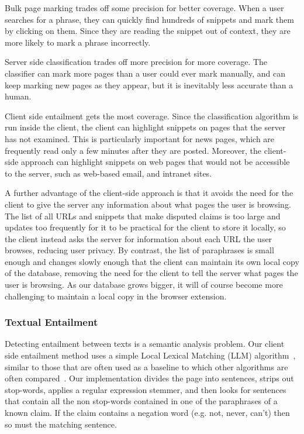\documentclass{www2010-submission}
\begin{document}
Bulk page marking trades off some precision for better coverage. When a user searches for a phrase, they can quickly find hundreds of snippets and mark them by clicking on them. Since they are reading the snippet out of context, they are more likely to mark a phrase incorrectly. 

Server side classification trades off more precision for more coverage. The classifier can mark more pages than a user could ever mark manually, and can keep marking new pages as they appear, but it is inevitably less accurate than a human.

Client side entailment gets the most coverage. Since the classification algorithm is run inside the client, the client can highlight snippets on pages that the server has not examined. This is particularly important for news pages, which are frequently read only a few minutes after they are posted. Moreover, the client-side approach can highlight snippets on web pages that would not be accessible to the server, such as web-based email, and intranet sites. 

A further advantage of the client-side approach is that it avoids the need for the client to give the server any information about what pages the user is browsing. The list of all URLs and snippets that make disputed claims is too large and updates too frequently for it to be practical for the client to store it locally, so the client instead asks the server for information about each URL the user browses, reducing user privacy. By contrast, the list of paraphrases is small enough and changes slowly enough that the client can maintain its own local copy of the database, removing the need for the client to tell the server what pages the user is browsing. As our database grows bigger, it will of course become more challenging to maintain a local copy in the browser extension.

\subsubsection{Textual Entailment}

Detecting entailment between texts is a semantic analysis problem. Our client side entailment method uses a simple Local Lexical Matching (LLM) algorithm~\cite{Jijkoun2006}, similar to those that are often used as a baseline to which other algorithms are often compared~\cite{Braz}. Our implementation divides the page into sentences, strips out stop-words, applies a regular expression stemmer, and then looks for sentences that contain all the non stop-words contained in one of the paraphrases of a known claim. If the claim contains a negation word (e.g. not, never, can't) then so must the matching sentence. 
\end{document}
